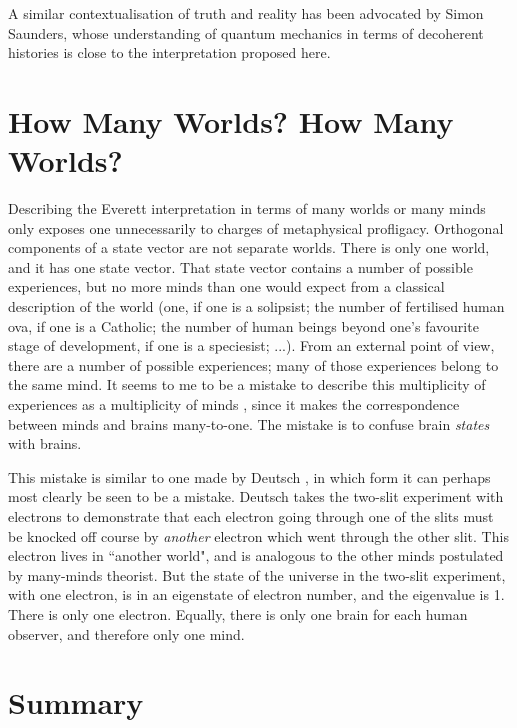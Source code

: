 \documentclass[12pt,a4paper,reqno]{article}
\renewcommand{\(}{\left(}
\renewcommand{\)}{\right)}
\newcommand{\<}{\langle}
\renewcommand{\>}{\rangle}
\theoremstyle{plain} %
\theoremstyle{definition}
\theoremstyle{remark}
\begin{document}
A similar contextualisation of truth and reality has been
advocated by Simon Saunders, whose understanding
of quantum mechanics in terms of decoherent
histories \cite{Saunders:Synthese1, Saunders:Synthese2, 
Saunders:Synthese3} is close to the interpretation proposed here.

\medskip
\section{How Many Worlds? How Many Worlds?}

Describing the Everett interpretation in terms
of many worlds or many minds only exposes one unnecessarily to charges of
metaphysical profligacy. Orthogonal components of a state vector are not
separate worlds. There is only one world, and it has one state vector.
That state vector contains a number of possible experiences, but no more
minds than one would expect from a classical description of the world
(one, if one is a solipsist; the number of fertilised human ova, if one
is a Catholic; the number of human beings beyond one's favourite stage
of development, if one is a speciesist; ...). From an
external point of view, there are a number of possible experiences; many
of those experiences belong to the same mind. It seems to me to be a
mistake to describe this multiplicity of experiences as a multiplicity of
minds \cite{Lockwood:manyminds, Albert:book, Donald:progress}, since it
makes the correspondence between minds and brains many-to-one. The
mistake is to confuse brain \emph{states} with brains.

This mistake is similar to one made by Deutsch \cite{Deutsch:book}, in
which form it can perhaps most clearly be seen to be a mistake. Deutsch
takes the two-slit experiment with electrons to demonstrate that each
electron going through one of the slits must be knocked off course by
\emph{another} electron which went through the other slit. This electron
lives in ``another world", and is analogous to the other minds
postulated by many-minds theorist. But the state of the universe in
the two-slit experiment, with one electron, is in an eigenstate of
electron number, and the eigenvalue is 1. There is only one electron.
Equally, there is only one brain for each human observer, and therefore
only one mind.

\section{Summary}
\end{document}
